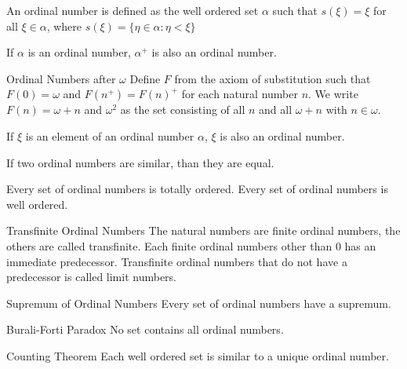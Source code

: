 \begin{defn}{}{} An ordinal number is defined as the well ordered set $\alpha$ such that $s(\xi)=\xi$ for all $\xi\in\alpha$, where $s(\xi)=\{\eta\in\alpha:\eta<\xi\}$
\end{defn}

\begin{thm}{}{} If $\alpha$ is an ordinal number, $\alpha^+$ is also an ordinal number. 
\end{thm}

\begin{defn}{Ordinal Numbers after $\omega$}{} Define $F$ from the axiom of substitution such that $F(0)=\omega$ and $F(n^+)=F(n)^+$ for each natural number $n$. We write $F(n)=\omega+n$ and $\omega^2$ as the set consisting of all $n$ and all $\omega+n$ with $n\in\omega$. 
\end{defn}

\begin{thm}{}{} If $\xi$ is an element of an ordinal number $\alpha$, $\xi$ is also an ordinal number. 
\end{thm}

\begin{thm}{}{} If two ordinal numbers are similar, than they are equal. 
\end{thm}

\begin{thm}{}{} Every set of ordinal numbers is totally ordered. Every set of ordinal numbers is well ordered. 
\end{thm}

\begin{thm}{Transfinite Ordinal Numbers}{} The natural numbers are finite ordinal numbers, the others are called transfinite. Each finite ordinal numbers other than $0$ has an immediate predecessor. Transfinite ordinal numbers that do not have a predecessor is called limit numbers. 
\end{thm}

\begin{thm}{Supremum of Ordinal Numbers}{} Every set of ordinal numbers have a supremum. 
\end{thm}

\begin{thm}{Burali-Forti Paradox}{} No set contains all ordinal numbers. 
\end{thm}

\begin{thm}{Counting Theorem}{} Each well ordered set is similar to a unique ordinal number. 
\end{thm}